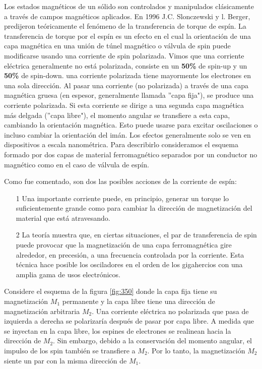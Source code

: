 Los estados magnéticos de un sólido son controlados y manipulados clásicamente a través de campos magnéticos aplicados. En 1996 J.C. Slonczewski y l. Berger, predijeron teóricamente el fenómeno de la transferencia de torque de espín. La transferencia de torque por el espín es un efecto en el cual la orientación de una capa magnética en una unión de túnel magnético o válvula de spin puede modificarse usando una corriente de spin polarizada. Vimos que una corriente eléctrica generalmente no está polarizada, consiste en un \textbf{50\%} de spin-up y un \textbf{50\%} de spin-down. una corriente polarizada tiene mayormente los electrones en una sola dirección. Al pasar una corriente (no polarizada) a través de una capa magnética gruesa (en espesor, generalmente llamada ''capa fija"), se produce una corriente polarizada. Si esta corriente se dirige a una segunda capa magnética más delgada (''capa libre"), el momento angular se transfiere a esta capa, cambiando la orientación magnética. Esto puede usarse para excitar oscilaciones o incluso cambiar la orientación del imán. Los efectos generalmente solo se ven en dispositivos a escala nanométrica. Para describirlo consideramos el esquema formado por dos capas de material ferromagnético separados por un conductor no magnético como en el caso de válvula de espín.

Como fue comentado, son dos las posibles acciones de la corriente de espín:

\begin{itemize}
	\item[1] Una importante corriente puede, en principio, generar un torque lo suficientemente grande como para cambiar la dirección de magnetización del material que está atravesando.
	 
	\item[2] La teoría muestra que, en ciertas situaciones, el par de transferencia de spin puede provocar que la magnetización de una capa ferromagnética gire alrededor, en precesión, a una frecuencia controlada por la corriente. Esta técnica hace posible los osciladores en el orden de los gigahercios con una amplia gama de usos electrónicos.

\end{itemize}

Considere el esquema de la figura \ref{fig:350} donde la capa fija tiene su magnetización $M_{1}$ permanente y la capa libre tiene una dirección de magnetización arbitraria $M_{2}$. Una corriente eléctrica no polarizada que pasa de izquierda a derecha se polarizaría después de pasar por capa libre. A medida que se inyectan en la capa libre, los espines de electrones se realinean hacia la dirección de $M_{2}$. Sin embargo, debido a la conservación del momento angular, el impulso de los spin también se transfiere a $M_{2}$. Por lo tanto, la magnetización $M_{2}$ siente un par con la misma dirección de $M_{1}$.

